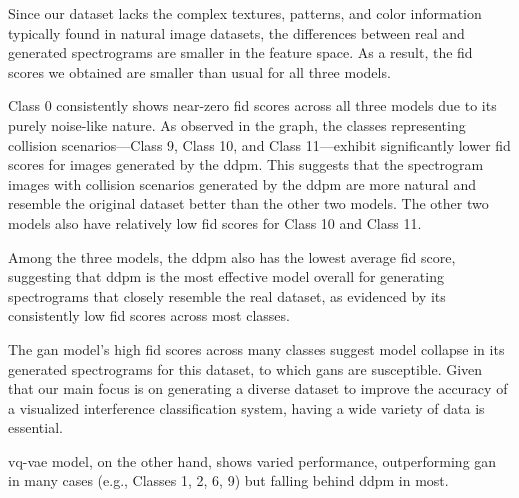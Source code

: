 Since our dataset lacks the complex textures, patterns, and color information typically found in natural image datasets, the differences between real and generated spectrograms are smaller in the feature space. As a result, the \gls{fid} scores we obtained are smaller than usual for all three models.

Class 0 consistently shows near-zero \gls{fid} scores across all three models due to its purely noise-like nature. As observed in the graph, the classes representing collision scenarios—Class 9, Class 10, and Class 11—exhibit significantly lower \gls{fid} scores for images generated by the \gls{ddpm}. This suggests that the spectrogram images with collision scenarios generated by the \gls{ddpm} are more natural and resemble the original dataset better than the other two models. The other two models also have relatively low \gls{fid} scores for Class 10 and Class 11.

Among the three models, the \gls{ddpm} also has the lowest average \gls{fid} score, suggesting that \gls{ddpm} is the most effective model overall for generating spectrograms that closely resemble the real dataset, as evidenced by its consistently low \gls{fid} scores across most classes.

The \gls{gan} model's high \gls{fid} scores across many classes suggest model collapse in its generated spectrograms for this dataset, to which \gls{gan}s are susceptible. Given that our main focus is on generating a diverse dataset to improve the accuracy of a visualized interference classification system, having a wide variety of data is essential.

\gls{vq-vae} model, on the other hand, shows varied performance, outperforming \gls{gan} in many cases (e.g., Classes 1, 2, 6, 9) but falling behind \gls{ddpm} in most.

